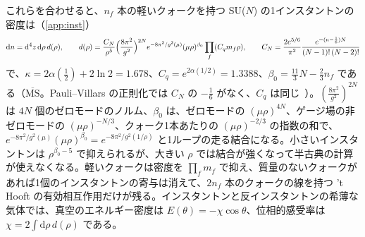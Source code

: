 \documentclass[a4paper,10pt]{ltjsarticle}
\newcommand{\dd}{\mathrm{d}}
\newcommand{\MSbar}{\overline{\mathrm{MS}}}
\begin{document}
これらを合わせると、$n_f$ 本の軽いクォークを持つ SU($N$) の1インスタントンの密度は（\ref{app:inst}）
\begin{equation}
\dd n=\dd^4z\,\dd\rho\,d(\rho),\qquad
d(\rho)=\frac{C_N}{\rho^5}\Bigl(\frac{8\pi^2}{g^2}\Bigr)^{2N}e^{-8\pi^2/g^2(\mu)}(\mu\rho)^{\beta_0}\prod_f(C_qm_f\rho),\qquad
C_N=\frac{2e^{5/6}}{\pi^2}\frac{e^{-(\kappa-\frac16)N}}{(N-1)!\,(N-2)!}
\label{eq:instdens}
\end{equation}
で、$\kappa=2\alpha(\frac12)+2\ln2=1.678$、$C_q=e^{2\alpha(1/2)}=1.3388$、$\beta_0=\frac{11}3N-\frac23n_f$ である（$\MSbar$。Pauli--Villars の正則化では $C_N$ の $-\frac16$ がなく、$C_q$ は同じ~\cite{thooft76,bernard79,hh81,thooft86,np94}）。$(\frac{8\pi^2}{g^2})^{2N}$ は $4N$ 個のゼロモードのノルム、$\beta_0$ は、ゼロモードの $(\mu\rho)^{4N}$、ゲージ場の非ゼロモードの $(\mu\rho)^{-N/3}$、クォーク1本あたりの $(\mu\rho)^{-2/3}$ の指数の和で、$e^{-8\pi^2/g^2(\mu)}(\mu\rho)^{\beta_0}=e^{-8\pi^2/g^2(1/\rho)}$ と1ループの走る結合になる。小さいインスタントンは $\rho^{\beta_0-5}$ で抑えられるが、大きい $\rho$ では結合が強くなって半古典の計算が使えなくなる。軽いクォークは密度を $\prod_fm_f$ で抑え、質量のないクォークがあれば1個のインスタントンの寄与は消えて、$2n_f$ 本のクォークの線を持つ 't Hooft の有効相互作用だけが残る。インスタントンと反インスタントンの希薄な気体では、真空のエネルギー密度は $E(\theta)=-\chi\cos\theta$、位相的感受率は $\chi=2\int\dd\rho\,d(\rho)$ である。
\end{document}
